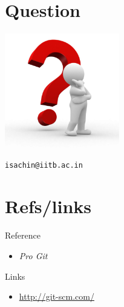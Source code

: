 \documentclass[bigger, presentation]{beamer}
\begin{document}
\section{Question}
\label{sec-7}
\begin{frame}[fragile]

   \includegraphics[width=5cm,angle=0]{./questions.png}
   

\begin{verbatim}
isachin@iitb.ac.in
\end{verbatim}
\end{frame}
\section{Refs/links}
\label{sec-8}
\begin{frame}
\begin{block}{Reference}
\label{sec-8-1-1}

\begin{itemize}
\item \emph{Pro Git}
\end{itemize}
\end{block}
\begin{block}{Links}
\label{sec-8-1-2}

\begin{itemize}
\item \href{http://www.emacswiki.org/emacs/}{http://git-scm.com/}
\end{itemize}
\end{block}
\end{frame}
\end{document}
